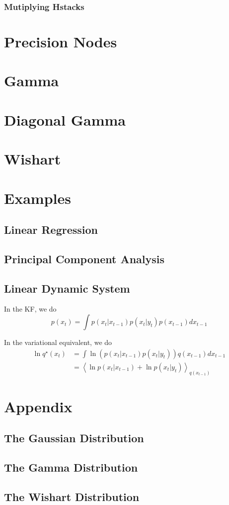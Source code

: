 \documentclass{article}
\newcommand{\<}{\langle}
\renewcommand{\>}{\rangle}
\begin{document}
\subsubsection{Mutiplying Hstacks}


\section{Precision Nodes}
\section{Gamma}
\section{Diagonal Gamma}
\section{Wishart}

\section{Examples}
\subsection{Linear Regression}
\subsection{Principal Component Analysis}

\subsection{Linear Dynamic System}
\label{examples:LDS}
In the KF, we do
\begin{equation}
p(x_t) = \int p(x_t | x_{t-1}) p(x_t | y_t) p(x_{t-1}) d x_{t-1}
\end{equation}

In the variational equivalent, we do
\begin{equation}
\begin{split}
\ln q^\star(x_t) &= \int \ln \left( p(x_t | x_{t-1}) p(x_t | y_t) \right) q(x_{t-1}) d x_{t-1}\\
            &= \left<  \ln  p(x_t | x_{t-1})  + \ln p(x_t | y_t)  \right>_{q(x_{t-1})}
\end{split}
\end{equation}


\section{Appendix}
\subsection{The Gaussian Distribution}
\subsection{The Gamma Distribution}
\subsection{The Wishart Distribution}
\end{document}
